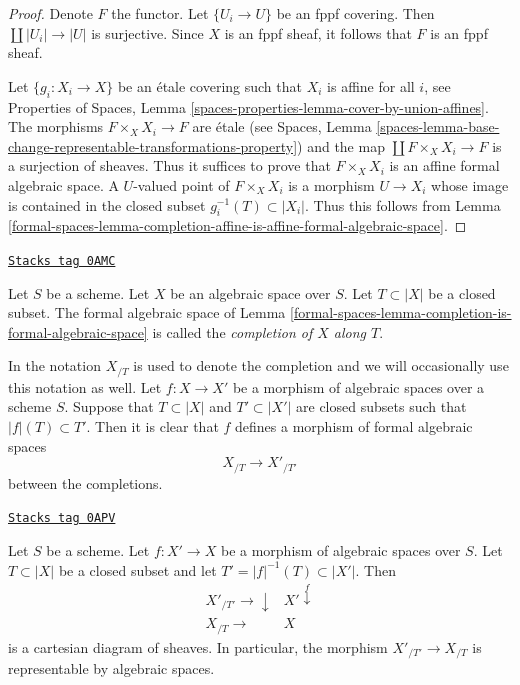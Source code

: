 \begin{proof}
Denote $F$ the functor. Let $\{U_i \to U\}$ be an fppf covering.
Then $\coprod |U_i| \to |U|$ is surjective. Since $X$ is an fppf
sheaf, it follows that $F$ is an fppf sheaf.

\medskip\noindent
Let $\{g_i : X_i \to X\}$ be an \'etale covering such that $X_i$ is affine
for all $i$, see Properties of Spaces, Lemma
\ref{spaces-properties-lemma-cover-by-union-affines}.
The morphisms $F \times_X X_i \to F$ are \'etale
(see Spaces, Lemma
\ref{spaces-lemma-base-change-representable-transformations-property})
and the map $\coprod F \times_X X_i \to F$ is a surjection of sheaves.
Thus it suffices to prove that $F \times_X X_i$ is an affine formal
algebraic space. A $U$-valued point of $F \times_X X_i$ is a
morphism $U \to X_i$ whose image is contained in the closed subset
$g_i^{-1}(T) \subset |X_i|$. Thus this follows from
Lemma \ref{formal-spaces-lemma-completion-affine-is-affine-formal-algebraic-space}.
\end{proof}

\begin{definition}[Completion]
\label{formal-spaces-definition-completion}
\href{https://stacks.math.columbia.edu/tag/0AMC}{\texttt{Stacks tag 0AMC}}

Let $S$ be a scheme. Let $X$ be an algebraic space over $S$.
Let $T \subset |X|$ be a closed subset. The formal algebraic space
of Lemma \ref{formal-spaces-lemma-completion-is-formal-algebraic-space}
is called the {\it completion of $X$ along $T$}.
\end{definition}

In \cite[Chapter I, Section 10.8]{EGA} the notation $X_{/T}$
is used to denote the completion and we will occasionally use
this notation as well. Let $f : X \to X'$ be
a morphism of algebraic spaces over a scheme $S$. Suppose
that $T \subset |X|$ and $T' \subset |X'|$ are closed subsets
such that $|f|(T) \subset T'$. Then it is clear that
$f$ defines a morphism of formal algebraic spaces
$$
X_{/T} \longrightarrow X'_{/T'}
$$
between the completions.

\begin{lemma}
\label{formal-spaces-lemma-map-completions-representable}
\href{https://stacks.math.columbia.edu/tag/0APV}{\texttt{Stacks tag 0APV}}

Let $S$ be a scheme. Let $f : X' \to X$ be a morphism
of algebraic spaces over $S$. Let $T \subset |X|$
be a closed subset and let $T' = |f|^{-1}(T) \subset |X'|$.
Then
$$
\begin{array}{cc}X'_{/T'} \longrightarrow\downarrow & X' \overset{f}{\downarrow} \\ X_{/T} \longrightarrow & X\end{array}
$$
is a cartesian diagram of sheaves. In particular, the morphism
$X'_{/T'} \to X_{/T}$ is representable by algebraic spaces.
\end{lemma}

